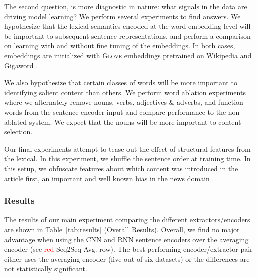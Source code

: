  The second question, is more diagnostic in nature: what signals
 in the data are driving model learning?
 We perform several experiments to find answers. 
 We hypothesize that the lexical semantics encoded at the word embedding
 level will be important to subsequent sentence representations, and
 perform a comparison on learning with and without fine tuning of the 
 embeddings. In both cases, embeddings are initialized with \textsc{Glove}
 embeddings pretrained on Wikipedia and Gigaword \cite{pennington2014glove}.
 
 
 We also hypothesize that certain classes of words will be more important 
 to identifying salient content than others. We perform word ablation 
 experiments where we alternately remove nouns, verbs, adjectives \& adverbs,
 and function words from the sentence encoder input and compare performance 
 to the non-ablated system. We expect that the nouns will be more important
 to content selection. 


 Our final experiments attempt to tease out the effect of structural features 
 from the lexical. In this experiment, we shuffle the sentence order at 
 training time. In this setup, we obfuscate features about which content 
 was introduced in the article first, an important and well known bias in the
 news domain \cite{nenkova2005automatic}. 

 

 \subsubsection{Results}

 
  

The results of our main experiment comparing 
the different extractors/encoders are shown in 
Table~\ref{tab:results} (Overall Results).
Overall, we find no major advantage when using the CNN and RNN sentence
encoders over the averaging encoder (see \textcolor{red}{red} Seq2Seq Avg. row). The best performing encoder/extractor pair either 
uses the averaging 
encoder (five out of six datasets) or the differences 
are not statistically significant. %

